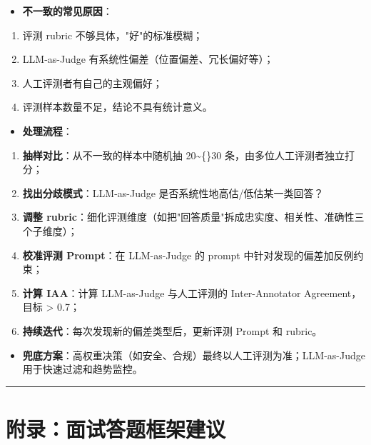 \documentclass[9pt,a4paper,twocolumn]{ctexart}
\begin{document}
\begin{itemize}[itemsep=1pt, topsep=2pt]
  \item \textbf{不一致的常见原因}：
\end{itemize}
\begin{enumerate}[itemsep=1pt, topsep=2pt]
  \item 评测 rubric 不够具体，"好"的标准模糊；
  \item LLM-as-Judge 有系统性偏差（位置偏差、冗长偏好等）；
  \item 人工评测者有自己的主观偏好；
  \item 评测样本数量不足，结论不具有统计意义。
\end{enumerate}
\begin{itemize}[itemsep=1pt, topsep=2pt]
  \item \textbf{处理流程}：
\end{itemize}
\begin{enumerate}[itemsep=1pt, topsep=2pt]
  \item \textbf{抽样对比}：从不一致的样本中随机抽 20\textasciitilde\{\}30 条，由多位人工评测者独立打分；
  \item \textbf{找出分歧模式}：LLM-as-Judge 是否系统性地高估/低估某一类回答？
  \item \textbf{调整 rubric}：细化评测维度（如把"回答质量"拆成忠实度、相关性、准确性三个子维度）；
  \item \textbf{校准评测 Prompt}：在 LLM-as-Judge 的 prompt 中针对发现的偏差加反例约束；
  \item \textbf{计算 IAA}：计算 LLM-as-Judge 与人工评测的 Inter-Annotator Agreement，目标 > 0.7；
  \item \textbf{持续迭代}：每次发现新的偏差类型后，更新评测 Prompt 和 rubric。
\end{enumerate}
\begin{itemize}[itemsep=1pt, topsep=2pt]
  \item \textbf{兜底方案}：高权重决策（如安全、合规）最终以人工评测为准；LLM-as-Judge 用于快速过滤和趋势监控。
\end{itemize}


\vspace{2pt}
\noindent\rule{\columnwidth}{0.3pt}\vspace{2pt}





\section*{附录：面试答题框架建议}
\end{document}
